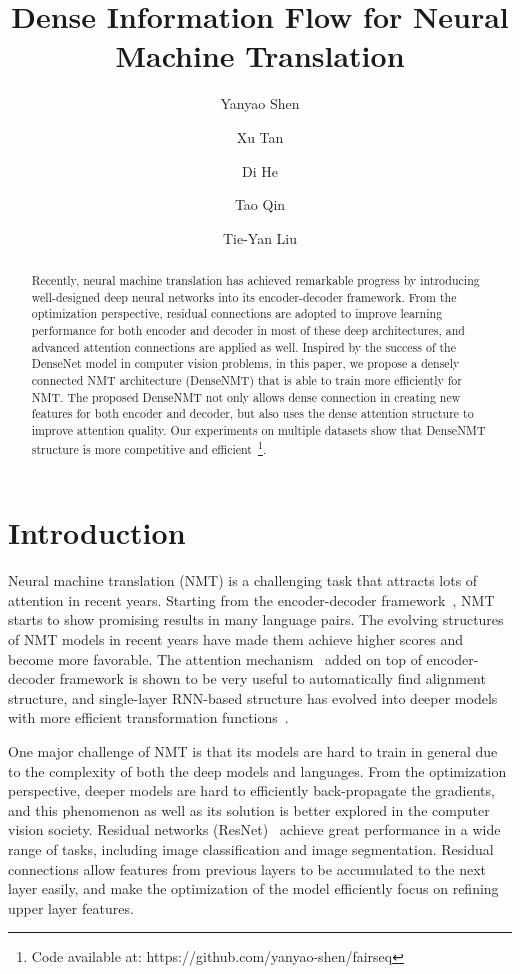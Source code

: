 \documentclass[11pt,a4paper]{article}
\title{Dense Information Flow for Neural Machine Translation}
\author[1]{Yanyao Shen}
\author[2]{Xu Tan}
\author[3]{Di He}
\author[2]{Tao Qin}
\author[2]{Tie-Yan Liu}
\affil[1]{University of Texas at Austin}
\affil[2]{Microsoft Research, Asia}
\affil[3]{Key Laboratory of Machine Perception, MOE, School of EECS, Peking University}
\affil[ ]{shenyanyao@utexas.edu, \{xuta,taoqin,tie-yan.liu\}@microsoft.com,di\_he@pku.edu.cn}
\begin{document}
\maketitle

\begin{abstract}
Recently, neural machine translation has achieved remarkable progress by introducing well-designed deep neural networks into its encoder-decoder framework.
From the optimization perspective, 
residual connections are adopted to improve learning performance for both encoder and decoder in most of these deep architectures, and advanced attention connections are applied as well. 
Inspired by the success of the DenseNet model in computer vision problems, in this paper, we propose a densely connected NMT architecture (DenseNMT) that is able to train more efficiently for NMT. 
The proposed DenseNMT not only allows dense connection in creating new features for both encoder and decoder, but also uses the dense attention structure to improve attention quality. 
Our experiments on multiple datasets show that  DenseNMT structure is more competitive and efficient~\footnote{Code available at:  https://github.com/yanyao-shen/fairseq}. 
\end{abstract}


\section{Introduction}
Neural machine translation (NMT) is a challenging task that attracts lots of attention in recent years. 
Starting from the encoder-decoder framework~\cite{cho2014learning}, NMT starts to show promising results in many language pairs.
The evolving structures of NMT models in recent years have made them achieve higher scores and become more favorable. 
The attention mechanism~\cite{bahdanau2014neural} added on top of encoder-decoder framework is shown to be very useful to automatically find alignment structure, and single-layer RNN-based structure has evolved into deeper models with more efficient transformation functions~\cite{convs2s,slicenet,transformer}.


One major challenge of NMT is that its models are hard to train in general due to the complexity of both the deep models and languages. 
From the optimization perspective, deeper models are hard to efficiently back-propagate the gradients, and this phenomenon as well as its solution is better explored in the computer vision society. 
Residual networks (ResNet)~\cite{resnet} achieve great performance in a wide range of tasks, including image classification and image segmentation. 
Residual connections allow features from previous layers to be accumulated to the next layer easily, and make the optimization of the model efficiently focus on refining upper layer features. 
\end{document}
